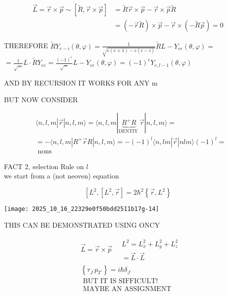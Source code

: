$$
\begin{aligned}
\vec{L}=\vec{r} \times \vec{p} \sim[\tilde{R}, \vec{r} \times \vec{p}] & =\tilde{R} \vec{r} \times \vec{p}-\vec{r} \times \vec{p} \tilde{R} \\
& =(-\vec{r} \tilde{R}) \times \vec{p}-\vec{r} \times(-\tilde{R} \vec{p})=0
\end{aligned}
$$

THEREFORE $\tilde{R} Y_{e-i}(\theta, \varphi)=\frac{1}{\sqrt{e(e+1)-e(e-i)}} \tilde{R} L-Y_{ee}(\theta, \varphi)=$\\
$=\frac{1}{\sqrt{\ldots}} L \cdot \tilde{R} Y_{ee}=\frac{(-1)^{e}}{\sqrt{-}} L-Y_{ee}(\theta, \varphi)=(-1)^{e} Y_{e, l-1}(\theta, \varphi)$

AND BY RECURSION IT WORKS FOR ANY m

BUT NOW CONSIDER

$$
\begin{aligned}
& \langle n, l, m| \vec{r}|n, l, m\rangle=\langle n, l, m| \underbrace{R^{+} R}_{\text {DENTIY }} \vec{r}|n, l, m\rangle= \\
& =-\langle n, l, m| R^{+} \vec{r} R|n, l, m\rangle=-(-1)^{l}\langle n, l m| \vec{r}|n l m\rangle(-1)^{l}= \\
& \text { nons }
\end{aligned}
$$

FACT 2, selection Rule on $l$\\
we start from a (not neoven) equation

$$
\left[L^{2},\left[L^{2}, \vec{r}\right]=2 \hbar^{2}\left\{\vec{r}, L^{2}\right\}\right.
$$

\begin{center}
\texttt{[image: 2025\_10\_16\_22329e0f50bdd2511b17g-14]}
\end{center}

THIS CAN BE DEMONSTRATED USING ONCY

$$
\begin{aligned}
& \vec{L}=\vec{r} \times \vec{p} \quad \begin{array}{l}
L^{2}=L_{x}^{2}+L_{y}^{2}+L_{z}^{2} \\
=\vec{L} \cdot \vec{L}
\end{array} \\
& \left\{\tau_{J^{\prime}} p_{T^{\prime}}\right\}=i \hbar \delta_{J^{\prime}} \\
& \text { BUT IT IS SIFFICULT! } \\
& \text { MAYBE AN ASSIGNMENT }
\end{aligned}
$$

